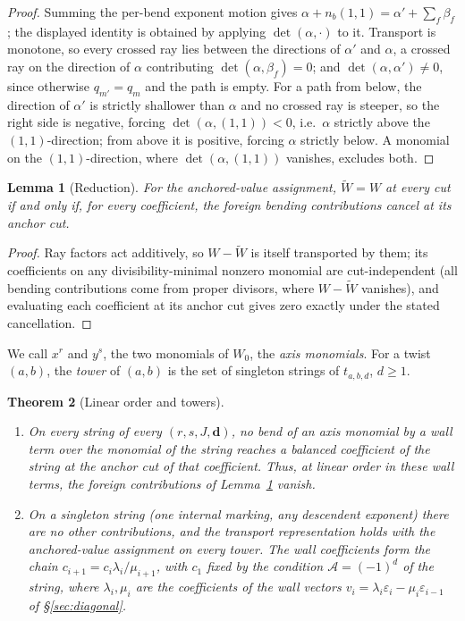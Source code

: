 \documentclass[11pt]{amsart}
\newtheorem{theorem}{Theorem}[section]
\newtheorem{lemma}[theorem]{Lemma}
\theoremstyle{definition}
\theoremstyle{remark}
\newcommand{\Ascr}{\mathcal{A}}
\begin{document}
\begin{proof}
Summing the per-bend exponent motion gives
$\alpha+n_b(1,1)=\alpha'+\sum_{f}\beta_{f}$; the displayed identity is obtained
by applying $\det(\alpha,\cdot)$ to it. Transport is monotone, so every crossed ray lies
between the directions of $\alpha'$ and $\alpha$, a crossed ray on the direction of
$\alpha$ contributing $\det(\alpha,\beta_f)=0$; and $\det(\alpha,\alpha')\ne0$,
since otherwise $q_{m'}=q_m$ and the path is empty. For a path from below, the
direction of $\alpha'$ is strictly shallower than $\alpha$ and no crossed ray is
steeper, so the right side is negative, forcing $\det(\alpha,(1,1))<0$, i.e.\ $\alpha$ strictly above
the $(1,1)$-direction; from above it is positive, forcing $\alpha$ strictly below. A monomial on the
$(1,1)$-direction, where $\det(\alpha,(1,1))$ vanishes, excludes both.
\end{proof}

\begin{lemma}[Reduction]
\label{lem:reduction}
For the anchored-value assignment, $\widetilde W=W$ at every cut if and only if, for
every coefficient, the foreign bending contributions cancel at its anchor cut.
\end{lemma}

\begin{proof}
Ray factors act additively, so $W-\widetilde W$ is itself transported by them; its
coefficients on any divisibility-minimal nonzero monomial are
cut-independent (all bending contributions come from proper divisors, where
$W-\widetilde W$ vanishes), and evaluating each coefficient at its anchor cut gives zero
exactly under the stated cancellation.
\end{proof}

We call $x^{r}$ and $y^{s}$, the two monomials of $W_0$, the \emph{axis
monomials}.  For a twist $(a,b)$, the \emph{tower} of $(a,b)$ is the set
of singleton strings of $t_{a,b,d}$, $d\ge1$.

\begin{theorem}[Linear order and towers]
\label{thm:linearorder}
\mbox{}
\begin{enumerate}
\item[(i)] On every string of every $(r,s,J,\mathbf d)$, no bend of an axis
monomial by a wall term over the monomial of the string reaches a balanced
coefficient of the string at the anchor cut of that coefficient.  Thus, at
linear order in these wall terms, the foreign contributions of
Lemma~\ref{lem:reduction} vanish.
\item[(ii)] On a singleton string (one internal marking, any descendent
exponent) there are no other contributions, and the transport representation
holds with the anchored-value assignment on every tower.  The wall
coefficients form the chain $c_{i+1}=c_{i}\lambda_{i}/\mu_{i+1}$, with $c_1$
fixed by the condition $\Ascr=(-1)^{d}$ of the string, where
$\lambda_i,\mu_i$ are the coefficients of the wall vectors
$v_i=\lambda_i\varepsilon_i-\mu_i\varepsilon_{i-1}$ of \S\ref{sec:diagonal}.
\end{enumerate}
\end{theorem}
\end{document}
